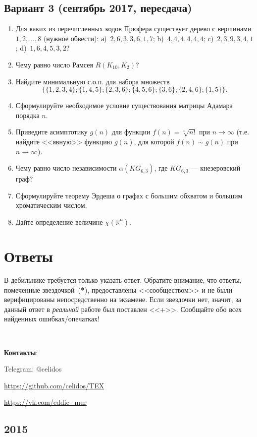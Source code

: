 \documentclass[oneside]{book}
\begin{document}
\section{Вариант 3 (сентябрь 2017, пересдача)}
\begin{enumerate}
\item Для каких из перечисленных кодов Прюфера существует дерево с вершинами $1, 2, \ldots, 8$ (нужное обвести): а)~$2, 6, 3, 3, 6, 1, 7$; b)~$4, 4, 4, 4, 4, 4$; c)~$2, 3, 9, 3, 4, 1$; d)~$1, 6, 4, 5, 3, 2$?
\item Чему равно число Рамсея $R(K_10, K_2)$?
\item Найдите минимальную с.о.п. для набора множеств
$$\{\{1,2,3,4\}; \{1,4,5\}; \{2,3,6\}; \{4,5,6\}; \{3,6\}; \{2,4,6\}; \{1,5\} \}.$$
\item Сформулируйте необходимое условие существования матрицы Адамара порядка $n$.
\item Приведите асимптотику $g(n)$ для функции $f(n) = \sqrt[n]{n!}$ при $n \rightarrow \infty$ (т.е. найдите <<явную>> функцию $g(n)$, для которой $f(n) \sim g(n)$ при $n \rightarrow \infty$).
\item Чему равно число независимости $\alpha(KG_{6,3})$, где $KG_{6,3}$ --- кнезеровский граф?
\item Сформулируйте теорему Эрдеша о графах с большим обхватом и большим хроматическим числом.
\item Дайте определение величине $\chi(\mathbb{R}^n)$.
\end{enumerate}

\chapter{Ответы}

В дебильнике требуется только указать ответ. Обратите внимание, что ответы, помеченные звездочкой~(\textbf{*}),  предоставлены <<сообществом>> и не были верифицированы непосредственно на экзамене. Если звездочки нет, значит, за данный ответ в \textit{реальной} работе был поставлен <<+>>. Сообщайте обо всех найденных ошибках/опечатках!

~

\textbf{Контакты}:

Telegram: @celidos

\url{https://github.com/celidos/TEX}

\url{https://vk.com/eddie\_mur}

\section{2015}
\end{document}
